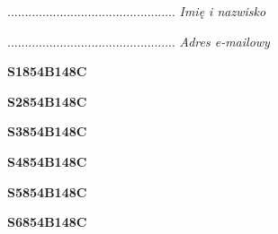 \begin{turn}{90}\begin{minipage}{\linewidth} \vspace{20mm} ................................................  \textit{Imię i nazwisko}\end{minipage}\end{turn}

\begin{turn}{90}\begin{minipage}{\linewidth} \vspace{20mm} ................................................  \textit{Adres e-mailowy}\end{minipage}\end{turn}

\begin{turn}{90}\huge \begin{minipage}{\linewidth} \vspace{10mm}\textbf{S1854B148C}\end{minipage}\end{turn}

\begin{turn}{90}\huge \begin{minipage}{\linewidth} \vspace{10mm}\textbf{S2854B148C}\end{minipage}\end{turn}

\begin{turn}{90}\huge \begin{minipage}{\linewidth} \vspace{10mm}\textbf{S3854B148C}\end{minipage}\end{turn}

\begin{turn}{90}\huge \begin{minipage}{\linewidth} \vspace{10mm}\textbf{S4854B148C}\end{minipage}\end{turn}

\begin{turn}{90}\huge \begin{minipage}{\linewidth} \vspace{10mm}\textbf{S5854B148C}\end{minipage}\end{turn}

\begin{turn}{90}\huge \begin{minipage}{\linewidth} \vspace{10mm}\textbf{S6854B148C}\end{minipage}\end{turn}

